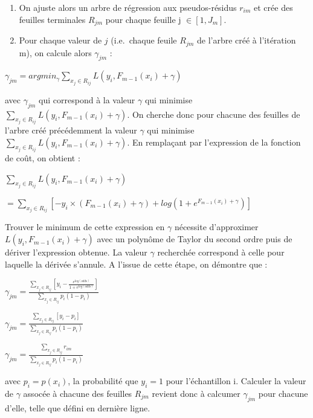 \documentclass[
]{article}
\begin{document}
\begin{enumerate}
\def\labelenumi{\Alph{enumi})}
\setcounter{enumi}{1}
\item
  On ajuste alors un arbre de régression aux pseudos-résidus \(r_{im}\)
  et crée des feuilles terminales \(R_{jm}\) pour chaque feuille j
  \(\in [1,J_m]\).
\item
  Pour chaque valeur de \(j\) (i.e.~chaque feuile \(R_{jm}\) de l'arbre
  créé à l'itération m), on calcule alors \(\gamma_{jm}\) :
\end{enumerate}

\begin{center}
  $\gamma_{jm}=argmin_{\gamma}\sum_{x_j \in R_{ij}}L(y_i,F_{m-1}(x_i)+\gamma)$
\end{center}

avec \(\gamma_{jm}\) qui correspond à la valeur \(\gamma\) qui minimise
\(\sum_{x_j \in R_{ij}}L(y_i,F_{m-1}(x_i)+\gamma)\). On cherche donc
pour chacune des feuilles de l'arbre créé précédemment la valeur
\(\gamma\) qui minimise
\(\sum_{x_j \in R_{ij}}L(y_i,F_{m-1}(x_i)+\gamma)\). En remplaçant par
l'expression de la fonction de coût, on obtient :

\begin{center}
  $\sum_{x_j \in R_{ij}}L(y_i,F_{m-1}(x_i)+\gamma)$
  
  $=\sum_{x_j \in R_{ij}}[-y_i \times (F_{m-1}(x_i)+ \gamma)+log(1+e^{F_{m-1}(x_i)+\gamma})]$
\end{center}

Trouver le minimum de cette expression en \(\gamma\) nécessite
d'approximer \(L(y_i,F_{m-1}(x_i)+\gamma)\) avec un polynôme de Taylor
du second ordre puis de dériver l'expression obtenue. La valeur
\(\gamma\) recherchée correspond à celle pour laquelle la dérivée
s'annule. A l'issue de cette étape, on démontre que :

\begin{center}
  $\gamma_{jm}=\frac{\sum_{x_j \in R_{ij}}[y_i-\frac{e^{log(odds)}}{1+e^{log(odds)}}]}{\sum_{x_j \in R_{ij}}p_i(1-p_i)}$
  
  $\gamma_{jm}=\frac{\sum_{x_j \in R_{ij}}[y_i-p_i]}{\sum_{x_j \in R_{ij}}p_i(1-p_i)}$
  
  $\gamma_{jm}=\frac{\sum_{x_j \in R_{ij}}r_{im}}{\sum_{x_j \in R_{ij}}p_i(1-p_i)}$
\end{center}

avec \(p_i=p(x_i)\), la probabilité que \(y_i=1\) pour l'échantillon i.
Calculer la valeur de \(\gamma\) assocée à chacune des feuilles
\(R_{jm}\) revient donc à calcumer \(\gamma_{jm}\) pour chacune d'elle,
telle que défini en dernière ligne.
\end{document}

